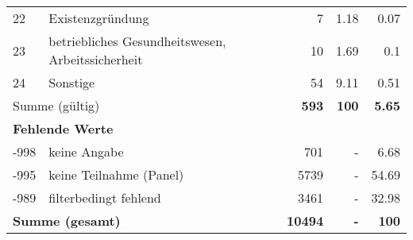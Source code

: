 \begin{longtable}{lXrrr}
        22 & \multicolumn{1}{X}{Existenzgründung} & %
          \num{7} &
          \num[round-mode=places,round-precision=2]{1,18} &
          \num[round-mode=places,round-precision=2]{0,07} \\

        23 & \multicolumn{1}{X}{betriebliches Gesundheitswesen, Arbeitssicherheit} & %
          \num{10} &
          \num[round-mode=places,round-precision=2]{1,69} &
          \num[round-mode=places,round-precision=2]{0,1} \\

        24 & \multicolumn{1}{X}{Sonstige} & %
          \num{54} &
          \num[round-mode=places,round-precision=2]{9,11} &
          \num[round-mode=places,round-precision=2]{0,51} \\

     \midrule
     \multicolumn{2}{l}{Summe (gültig)} &
       \textbf{\num{593}} &
     \textbf{100} &
       \textbf{\num[round-mode=places,round-precision=2]{5,65}} \\
     \multicolumn{5}{l}{\textbf{Fehlende Werte}}\\
       -998 &
       keine Angabe &
         \num{701} &
        - &
         \num[round-mode=places,round-precision=2]{6,68} \\
       -995 &
       keine Teilnahme (Panel) &
         \num{5739} &
        - &
         \num[round-mode=places,round-precision=2]{54,69} \\
       -989 &
       filterbedingt fehlend &
         \num{3461} &
        - &
         \num[round-mode=places,round-precision=2]{32,98} \\
     \midrule
     \multicolumn{2}{l}{\textbf{Summe (gesamt)}} &
          \textbf{\num{10494}} &
        \textbf{-} &
        \textbf{100} \\
     \bottomrule
     \end{longtable}
     
